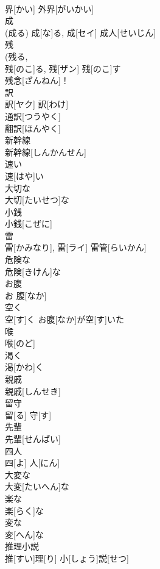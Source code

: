 \documentclass[8pt]{extreport}
\begin{document}
\begin{CJK}{UTF8}{min}
\\	界[かい]	外界[がいかい] 
\\	成	
\\	(成る)	成[な]る, 成[セイ]	成人[せいじん] 
\\	残	
\\	(残る, 
\\	残[のこ]る, 残[ザン]	残[のこ]す 
\\	残念[ざんねん]！ 
\\	訳	
\\	訳[ヤク]	訳[わけ] 
\\	通訳[つうやく] 
\\	翻訳[ほんやく] 
\\	新幹線	
\\	新幹線[しんかんせん]	
\\	速い	
\\	速[はや]い	
\\	大切な	
\\	大切[たいせつ]な	
\\	小銭	
\\	小銭[こぜに]	
\\	雷	
\\	雷[かみなり], 雷[ライ]	雷管[らいかん] 
\\	危険な	
\\	危険[きけん]な	
\\	お腹	
\\	お 腹[なか]	
\\	空く	
\\	空[す]く	お腹[なか]が空[す]いた 
\\	喉	
\\	喉[のど]	
\\	渇く	
\\	渇[かわ]く	
\\	親戚	
\\	親戚[しんせき]	
\\	留守	
\\	留[る] 守[す]	
\\	先輩	
\\	先輩[せんぱい]	
\\	四人	
\\	四[よ] 人[にん]	
\\	大変な	
\\	大変[たいへん]な	
\\	楽な	
\\	楽[らく]な	
\\	変な	
\\	変[へん]な	
\\	推理小説	
\\	推[すい]理[り] 小[しょう]説[せつ]	

\end{CJK}
\end{document}
